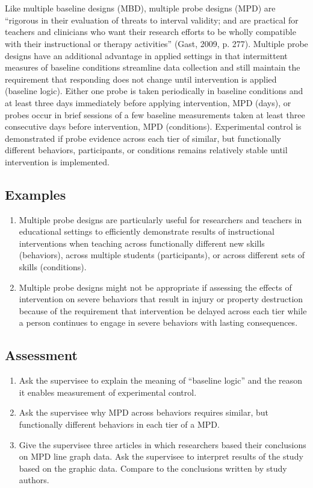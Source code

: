 \section{\fourbEight{}}
Like multiple baseline designs (MBD), multiple probe designs (MPD) are ``rigorous in their evaluation of threats to interval validity; and are practical for teachers and clinicians who want their research efforts to be wholly compatible with their instructional or therapy activities'' (Gast, 2009, p. 277). Multiple probe designs have an additional advantage in applied settings in that intermittent measures of baseline conditions streamline data collection and still maintain the requirement that responding does not change until intervention is applied (baseline logic). Either one probe is taken periodically in baseline conditions and at least three days immediately before applying intervention, MPD (days), or probes occur in brief sessions of a few baseline measurements taken at least three consecutive days before intervention, MPD (conditions). Experimental control is demonstrated if probe evidence across each tier of similar, but functionally different behaviors, participants, or conditions remains relatively stable until intervention is implemented. 
%
\subsection{Examples}
\begin{enumerate}
\item Multiple probe designs are particularly useful for researchers and teachers in educational settings to efficiently demonstrate results of instructional interventions when teaching across functionally different new skills (behaviors), across multiple students (participants), or across different sets of skills (conditions).
\item Multiple probe designs might not be appropriate if assessing the effects of intervention on severe behaviors that result in injury or property destruction because of the requirement that intervention be delayed across each tier while a person continues to engage in severe behaviors with lasting consequences.
\end{enumerate}
%
\subsection{Assessment}
\begin{enumerate}
\item Ask the supervisee to explain the meaning of ``baseline logic'' and the reason it enables measurement of experimental control.
\item Ask the supervisee why MPD across behaviors requires similar, but functionally different behaviors in each tier of a MPD.
\item Give the supervisee three articles in which researchers based their conclusions on MPD line graph data. Ask the supervisee to interpret results of the study based on the graphic data. Compare to the conclusions written by study authors.
\end{enumerate}
%

